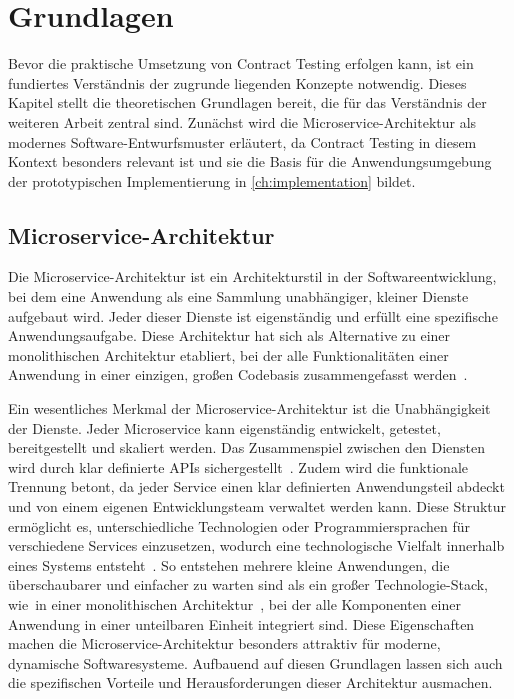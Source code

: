 \chapter{Grundlagen}\label{ch:foundation}

Bevor die praktische Umsetzung von Contract Testing erfolgen kann, ist ein fundiertes Verständnis der zugrunde liegenden Konzepte notwendig.
Dieses Kapitel stellt die theoretischen Grundlagen bereit, die für das Verständnis der weiteren Arbeit zentral sind.
Zunächst wird die Microservice-Architektur als modernes Software-Entwurfsmuster erläutert, da Contract Testing in diesem Kontext besonders relevant ist und sie die Basis für die Anwendungsumgebung der prototypischen Implementierung in \cref{ch:implementation} bildet.

\section{Microservice-Architektur}\label{sec:foundation_microservices}

Die Microservice-Architektur ist ein Architekturstil in der Softwareentwicklung, bei dem eine Anwendung als eine Sammlung unabhängiger, kleiner Dienste aufgebaut wird.
Jeder dieser Dienste ist eigenständig und erfüllt eine spezifische Anwendungsaufgabe.
Diese Architektur hat sich als Alternative zu einer monolithischen Architektur etabliert, bei der alle Funktionalitäten einer Anwendung in einer einzigen, großen Codebasis zusammengefasst werden~\cite{haroMicroserviceAPIs2023}.

Ein wesentliches Merkmal der Microservice-Architektur ist die Unabhängigkeit der Dienste.
Jeder Microservice kann eigenständig entwickelt, getestet, bereitgestellt und skaliert werden.
Das Zusammenspiel zwischen den Diensten wird durch klar definierte \glspl{API} sichergestellt~\cite{richardsonMicroservicesPatterns2018}.
Zudem wird die funktionale Trennung betont, da jeder Service einen klar definierten Anwendungsteil abdeckt und von einem eigenen Entwicklungsteam verwaltet werden kann.
Diese Struktur ermöglicht es, unterschiedliche Technologien oder Programmiersprachen für verschiedene Services einzusetzen, wodurch eine technologische Vielfalt innerhalb eines Systems entsteht~\cite{dowalilGrundlagenModularenSoftwareentwurfs2018a}.
So entstehen mehrere kleine Anwendungen, die überschaubarer und einfacher zu warten sind als ein großer
Technologie-Stack, wie~\zB in einer monolithischen Architektur~\cite{cruzContractTestingAction2025}, bei der alle Komponenten einer Anwendung in einer unteilbaren Einheit integriert sind.
Diese Eigenschaften machen die Microservice-Architektur besonders attraktiv für moderne, dynamische Softwaresysteme.
Aufbauend auf diesen Grundlagen lassen sich auch die spezifischen Vorteile und Herausforderungen dieser Architektur ausmachen.

